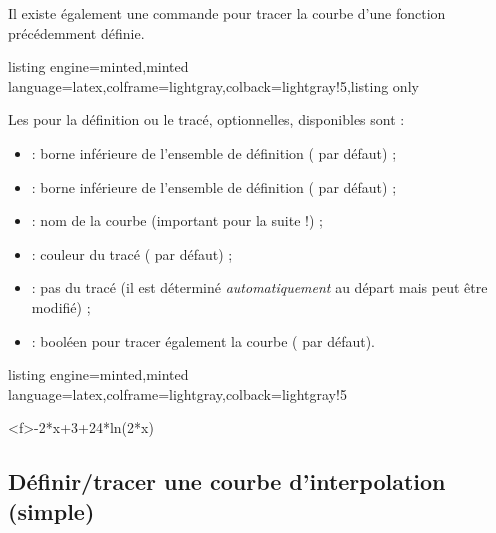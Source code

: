 \documentclass[11pt,a4paper]{ltxdoc}
\begin{document}
Il existe également une commande pour tracer la courbe d'une fonction précédemment définie.

\begin{tcblisting}{listing engine=minted,minted language=latex,colframe=lightgray,colback=lightgray!5,listing only}
\end{tcblisting}

Les \MontreCode{[clés]} pour la définition ou le tracé, optionnelles, disponibles sont :

\smallskip

\begin{itemize}
	\item {} : borne inférieure de l'ensemble de définition ( par défaut) ;
	\item {} : borne inférieure de l'ensemble de définition ( par défaut) ;
	\item {} : nom de la courbe (important pour la suite !) ;
	\item {} : couleur du tracé ( par défaut) ;
	\item {} : pas du tracé (il est déterminé \textit{automatiquement} au départ mais peut être modifié) ;
	\item {} : booléen pour tracer également la courbe ( par défaut).
\end{itemize}

\begin{tcblisting}{listing engine=minted,minted language=latex,colframe=lightgray,colback=lightgray!5}
\begin{GraphiqueTikz}%
	[x=0.9cm,y=0.425cm,Xmin=4,Xmax=20,Origx=4,
	Ymin=40,Ymax=56,Ygrille=2,Ygrilles=1,Origy=40]
	{-2*x+3+24*ln(2*x)}
\end{GraphiqueTikz}
\end{tcblisting}

\pagebreak

\subsection{Définir/tracer une courbe d'interpolation (simple)}\label{deftracinterpo}
\end{document}
